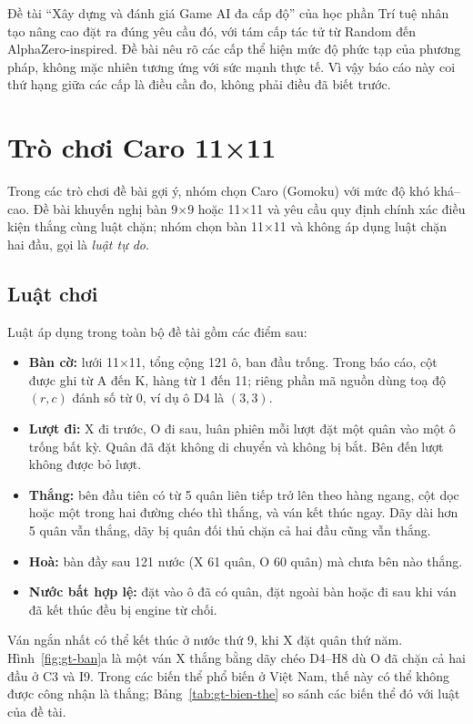 Đề tài ``Xây dựng và đánh giá Game AI đa cấp độ'' của học phần Trí tuệ nhân tạo nâng cao đặt ra đúng yêu cầu đó, với tám cấp tác tử từ Random đến AlphaZero-inspired. Đề bài nêu rõ các cấp thể hiện mức độ phức tạp của phương pháp, không mặc nhiên tương ứng với sức mạnh thực tế. Vì vậy báo cáo này coi thứ hạng giữa các cấp là điều cần đo, không phải điều đã biết trước.

\section{Trò chơi Caro 11×11}
\label{sec:gt-tro-choi}
Trong các trò chơi đề bài gợi ý, nhóm chọn Caro (Gomoku) với mức độ khó khá--cao. Đề bài khuyến nghị bàn 9×9 hoặc 11×11 và yêu cầu quy định chính xác điều kiện thắng cùng luật chặn; nhóm chọn bàn 11×11 và không áp dụng luật chặn hai đầu, gọi là \emph{luật tự do}.

\subsection{Luật chơi}
\label{sec:gt-luat}
Luật áp dụng trong toàn bộ đề tài gồm các điểm sau:
\begin{itemize}
  \item \textbf{Bàn cờ:} lưới 11×11, tổng cộng 121 ô, ban đầu trống. Trong báo cáo, cột được ghi từ A đến K, hàng từ 1 đến 11; riêng phần mã nguồn dùng toạ độ $(r, c)$ đánh số từ 0, ví dụ ô D4 là $(3, 3)$.
  \item \textbf{Lượt đi:} X đi trước, O đi sau, luân phiên mỗi lượt đặt một quân vào một ô trống bất kỳ. Quân đã đặt không di chuyển và không bị bắt. Bên đến lượt không được bỏ lượt.
  \item \textbf{Thắng:} bên đầu tiên có từ 5 quân liên tiếp trở lên theo hàng ngang, cột dọc hoặc một trong hai đường chéo thì thắng, và ván kết thúc ngay. Dãy dài hơn 5 quân vẫn thắng, dãy bị quân đối thủ chặn cả hai đầu cũng vẫn thắng.
  \item \textbf{Hoà:} bàn đầy sau 121 nước (X 61 quân, O 60 quân) mà chưa bên nào thắng.
  \item \textbf{Nước bất hợp lệ:} đặt vào ô đã có quân, đặt ngoài bàn hoặc đi sau khi ván đã kết thúc đều bị engine từ chối.
\end{itemize}

Ván ngắn nhất có thể kết thúc ở nước thứ 9, khi X đặt quân thứ năm. Hình~\ref{fig:gt-ban}a là một ván X thắng bằng dãy chéo D4--H8 dù O đã chặn cả hai đầu ở C3 và I9. Trong các biến thể phổ biến ở Việt Nam, thế này có thể không được công nhận là thắng; Bảng~\ref{tab:gt-bien-the} so sánh các biến thể đó với luật của đề tài.

